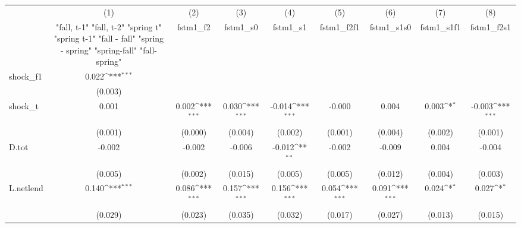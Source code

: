 {
\def\sym#1{\ifmmode^{#1}\else\(^{#1}\)\fi}
\begin{tabular}{l*{8}{c}}
\toprule
            &\multicolumn{1}{c}{(1)}&\multicolumn{1}{c}{(2)}&\multicolumn{1}{c}{(3)}&\multicolumn{1}{c}{(4)}&\multicolumn{1}{c}{(5)}&\multicolumn{1}{c}{(6)}&\multicolumn{1}{c}{(7)}&\multicolumn{1}{c}{(8)}\\
            &\multicolumn{1}{c}{  "fall, t-1" "fall, t-2" "spring t" "spring t-1"  "fall - fall" "spring - spring" "spring-fall" "fall-spring" }&\multicolumn{1}{c}{fstm1\_f2}&\multicolumn{1}{c}{fstm1\_s0}&\multicolumn{1}{c}{fstm1\_s1}&\multicolumn{1}{c}{fstm1\_f2f1}&\multicolumn{1}{c}{fstm1\_s1s0}&\multicolumn{1}{c}{fstm1\_s1f1}&\multicolumn{1}{c}{fstm1\_f2s1}\\
\midrule
shock\_f1    &       0.022\sym{***}&                     &                     &                     &                     &                     &                     &                     \\
            &     (0.003)         &                     &                     &                     &                     &                     &                     &                     \\
\addlinespace
shock\_t     &       0.001         &       0.002\sym{***}&       0.030\sym{***}&      -0.014\sym{***}&      -0.000         &       0.004         &       0.003\sym{*}  &      -0.003\sym{***}\\
            &     (0.001)         &     (0.000)         &     (0.004)         &     (0.002)         &     (0.001)         &     (0.004)         &     (0.002)         &     (0.001)         \\
\addlinespace
D.tot       &      -0.002         &      -0.002         &      -0.006         &      -0.012\sym{**} &      -0.002         &      -0.009         &       0.004         &      -0.004         \\
            &     (0.005)         &     (0.002)         &     (0.015)         &     (0.005)         &     (0.005)         &     (0.012)         &     (0.004)         &     (0.003)         \\
\addlinespace
L.netlend   &       0.140\sym{***}&       0.086\sym{***}&       0.157\sym{***}&       0.156\sym{***}&       0.054\sym{***}&       0.091\sym{***}&       0.024\sym{*}  &       0.027\sym{*}  \\
            &     (0.029)         &     (0.023)         &     (0.035)         &     (0.032)         &     (0.017)         &     (0.027)         &     (0.013)         &     (0.015)         \\

\end{tabular}}
